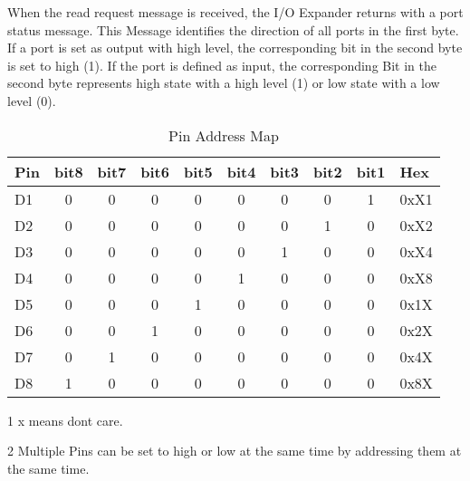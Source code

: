 \documentclass[10pt]{datasheet}
\begin{document}
When the read request message is received, the I/O Expander returns with a port 
status message. This Message identifies the direction of all ports in the first byte. 
If a port is set as output with high level, the corresponding bit in the second byte 
is set to high (1). If the port is defined as input, the corresponding Bit in the 
second byte represents high state with a high level (1) or low state 
with a low level (0).


\onecolumn

\begin{table}[h]
\begin{threeparttable}
\caption{Pin Address Map}
\label{table:Pin_address_map}
\begin{tabularx}{\textwidth}{l | c | c | c | c | c | c | c | c | X}
    \thickhline
    \textbf{Pin}	& \textbf{bit8}	& \textbf{bit7}	& \textbf{bit6}	& \textbf{bit5}	& \textbf{bit4}	& \textbf{bit3}	& \textbf{bit2}	& \textbf{bit1} 	& \textbf{Hex} \\
    \hline
    D1	&	0	&	0	&	0	&	0	&	0	&	0	&	0	&	1 	& 0xX1 \\
    \hline
    D2	&	0	&	0	&	0	&	0	&	0	&	0	&	1	&	0	& 0xX2 \\
    \hline
    D3	&	0	&	0	&	0	&	0	&	0	&	1	&	0	&	0	& 0xX4 \\
    \hline
    D4	&	0	&	0	&	0	&	0	&	1	&	0	&	0	&	0	& 0xX8 \\
    \hline
    D5	&	0	&	0	&	0	&	1	&	0	&	0	&	0	&	0	& 0x1X \\
    \hline
    D6	&	0	&	0	&	1	&	0	&	0	&	0	&	0	&	0	& 0x2X \\
    \hline
    D7	&	0	&	1	&	0	&	0	&	0	&	0	&	0	&	0	& 0x4X \\
    \hline
    D8	&	1	&	0	&	0	&	0	&	0	&	0	&	0	&	0	& 0x8X \\
\end{tabularx}
\begin{tablenotes}
\item[1]{x means dont care.}
\item[2]{Multiple Pins can be set to high or low at the same time by addressing them at the same time.}
\end{tablenotes}
\end{threeparttable}
\end{table}
\end{document}
